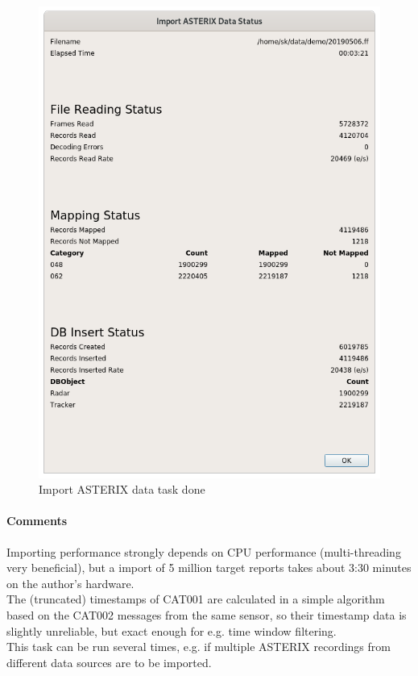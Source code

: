 \begin{figure}[H]
  \center
    \includegraphics[width=12cm]{figures/asterix_import_done.png}
  \caption{Import ASTERIX data task done}
\end{figure}

\paragraph{Comments}
Importing performance strongly depends on CPU performance (multi-threading very beneficial), but a import of 5 million target reports takes about 3:30 minutes on the author's hardware. \\

The (truncated) timestamps of CAT001 are calculated in a simple algorithm based on the CAT002 messages from the same sensor, so their timestamp data is slightly unreliable, but exact enough for e.g. time window filtering. \\

This task can be run several times, e.g. if multiple ASTERIX recordings from different data sources are to be imported. \\

